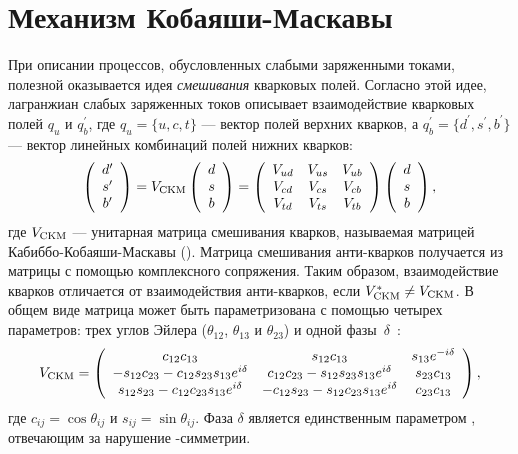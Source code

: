 \section{Механизм Кобаяши-Маскавы}\label{sec:ckm}
При описании процессов, обусловленных слабыми заряженными токами, полезной оказывается идея \emph{смешивания} кварковых полей.  Согласно этой идее, лагранжиан слабых заряженных токов описывает взаимодействие кварковых полей $q_u$ и $q_b^{\prime}$, где $q_u=\{u, c, t\}$ --- вектор полей верхних кварков, а $q_b^{\prime} = \{d^{\prime}, s^{\prime}, b^{\prime}\}$ --- вектор линейных комбинаций полей нижних кварков:
\begin{equation}\label{eq:ckm}
 \left(
 \begin{array}{c}
   d^{\prime} \\
   s^{\prime} \\
   b^{\prime} \\
  \end{array}
  \right)
  = V_{\mathrm{CKM}}
  \left(
  \begin{array}{c}
   d \\ s \\ b \\
  \end{array}
  \right)
  =
  \left(
  \begin{array}{ccc}
   V_{ud} & V_{us} & V_{ub} \\
   V_{cd} & V_{cs} & V_{cb} \\
   V_{td} & V_{ts} & V_{tb} \\
  \end{array}
  \right)\left(
  \begin{array}{c}
   d \\ s \\ b \\
  \end{array}
  \right),
\end{equation}
где $V_{\mathrm{CKM}}$ --- унитарная матрица смешивания кварков, называемая матрицей Кабиббо-Кобаяши-Маскавы (\ckm).  Матрица смешивания анти-кварков получается из матрицы \vckm с помощью комплексного сопряжения.  Таким образом, взаимодействие кварков отличается от взаимодействия анти-кварков, если $V_{\mathrm{CKM}}^*\neq V_{\mathrm{CKM}}$.  В общем виде матрица \vckm может быть параметризована с помощью четырех параметров: трех углов Эйлера ($\theta_{12}$, $\theta_{13}$ и $\theta_{23}$) и одной фазы~$\delta$~\cite{CKMEulerParams}:
\begin{equation}
 V_{\mathrm{CKM}} = 
 \left(
 \begin{array}{ccc}
  c_{12}c_{13}                               &  s_{12}c_{13}                               & s_{13}e^{-i\delta} \\
 -s_{12}c_{23}-c_{12}s_{23}s_{13}e^{i\delta} &  c_{12}c_{23}-s_{12}s_{23}s_{13}e^{i\delta} & s_{23}c_{13}       \\
  s_{12}s_{23}-c_{12}c_{23}s_{13}e^{i\delta} & -c_{12}s_{23}-s_{12}c_{23}s_{13}e^{i\delta} & c_{23}c_{13}       \\
 \end{array}
 \right),
\end{equation}
где $c_{ij} = \cos{\theta_{ij}}$ и $s_{ij} = \sin{\theta_{ij}}$.  Фаза $\delta$ является единственным параметром \cm, отвечающим за нарушение \cpconj-симметрии.

